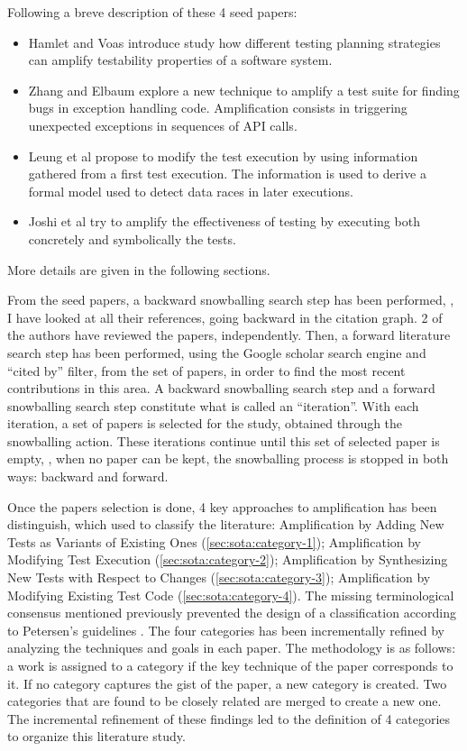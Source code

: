 Following a breve description of these 4 seed papers:
\begin{itemize}
	\item \cite{HamletV93} Hamlet and Voas introduce study how different testing planning strategies can amplify testability properties of a software system.
	\item \cite{zhang2012} Zhang and Elbaum explore a new technique to amplify a test suite for finding bugs in exception handling code. Amplification consists in triggering unexpected exceptions in sequences of API calls.
	\item \cite{leung12} Leung et al propose to modify the test execution by using information gathered from a first test execution. The information is used to derive a formal model used to detect data races in later executions.
	\item \cite{Joshi07} Joshi et al  try to amplify the effectiveness of testing by executing both concretely and symbolically the tests.
\end{itemize}
More details are given in the following sections.

From the seed papers, a backward snowballing search step \cite{jalali2012systematic} has been performed, \ie, I have looked at all their references, going backward in the citation graph. 
2 of the authors have reviewed the papers, independently. 
Then, a forward literature search step has been performed, using the Google scholar search engine and ``cited by'' filter, from the set of papers, in order to find the most recent contributions in this area.
A backward snowballing search step and a forward snowballing search step constitute what is called an ``iteration''.
With each iteration, a set of papers is selected for the study, obtained through the snowballing action.
These iterations continue until this set of selected paper is empty, \ie, when no paper can be kept, the snowballing process is stopped in both ways: backward and forward.

Once the papers selection is done, 4 key approaches to amplification has been distinguish, which used to classify the literature: 
Amplification by Adding New Tests as Variants of Existing Ones (\autoref{sec:sota:category-1});
Amplification by Modifying Test Execution (\autoref{sec:sota:category-2});
Amplification by Synthesizing New Tests with Respect to Changes (\autoref{sec:sota:category-3}); 
Amplification by Modifying Existing Test Code (\autoref{sec:sota:category-4}).
The missing terminological consensus mentioned previously prevented the design of a classification according to Petersen's guidelines
\cite{petersen2008systematic}.
The four categories has been incrementally refined by analyzing the techniques and goals in each paper.
The methodology is as follows: a work is assigned to a category if the key technique of the paper corresponds to it.
If no category captures the gist of the paper, a new category is created.
Two categories that are found to be closely related are merged to create a new one.
The incremental refinement of these findings led to the definition of 4 categories to organize this literature study.

